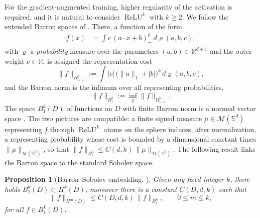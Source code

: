 \documentclass[11pt]{amsart}
\newtheorem{proposition}[theorem]{Proposition}
\theoremstyle{definition}
\theoremstyle{remark}
\DeclareMathOperator{\relu}{ReLU}
\newcommand{\reluk}{\relu^{k}}
\begin{document}
For the gradient-augmented training, higher regularity of the activation is required, and it is natural to consider $\reluk$ with $k \ge 2$. We follow the extended Barron spaces of \cite{li2024twolayer}. There, a function of the form
\begin{align*}
	f(x) &= \int c \, (a \cdot x + b)_+^k \, d\varrho(a, b, c),
\end{align*}
with $\varrho$ a \emph{probability} measure over the parameters $(a, b) \in \mathbb{R}^{d+1}$ and the outer weight $c \in \mathbb{R}$, is assigned the representation cost
\begin{equation*}
	\| f \|_{B^k_{1,\varrho}} := \int |c| \, \big( \|a\|_1 + |b| \big)^{k} \, d\varrho(a, b, c),
\end{equation*}
and the Barron norm is the infimum over all representing probabilities,
\begin{equation*}
	\| f \|_{B^{k}_{1}} := \inf_{\varrho} \| f \|_{B^{k}_{1,\varrho}} .
\end{equation*}
The space $B_1^k(D)$ of functions on $D$ with finite Barron norm is a normed vector space \cite[Theorem~6]{li2024twolayer}.
The two pictures are compatible: a finite signed measure $\mu \in \mathcal{M}(\mathbb{S}^d)$ representing $f$ through $\reluk$ atoms on the sphere induces, after normalization, a representing probability whose cost is bounded by a dimensional constant times $\|\mu\|_{\mathcal{M}(\mathbb{S}^d)}$, so that $\|f\|_{B^k_1} \le C(d, k)\, \|\mu\|_{\mathcal{M}(\mathbb{S}^d)}$.
The following result links the Barron space to the standard Sobolev space.
\begin{proposition}[Barron--Sobolev embedding, {\cite[Theorem~7]{li2024twolayer}}]
	Given any fixed integer $k$, there holds $B_1^k (D) \subset H^k(D)$; moreover there is a constant $C(D, d, k)$ such that
	\begin{equation*}
		\|f\|_{H^m(D)} \le C(D, d, k)\, \|f\|_{B_1^k}, \qquad 0 \le m \le k,
	\end{equation*}
	for all $f \in B_1^k(D)$.
\end{proposition}
\end{document}
